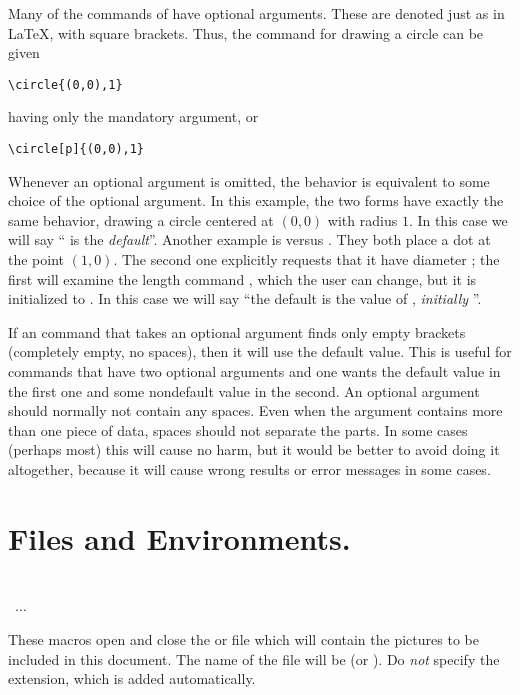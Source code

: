 \documentclass[letterpaper]{article}
\begin{document}
Many of the commands of \mfp{} have optional arguments. These are
denoted just as in \LaTeX{}, with square brackets. Thus, the command for
drawing a circle can be given
\begin{verbatim}
\circle{(0,0),1}
\end{verbatim}
having only the mandatory argument, or
\begin{verbatim}
\circle[p]{(0,0),1}
\end{verbatim}
Whenever an optional argument is omitted, the behavior is equivalent to
some choice of the optional argument. In this example, the two forms
have exactly the same behavior, drawing a circle centered at $(0,0)$
with radius $1$. In this case we will say `` is the
\emph{default}''. Another example is  versus
\oarg{3pt}. They both place a dot at the point
$(1,0)$. The second one explicitly requests that it have diameter
\dim{3pt}; the first will examine the length command ,
which the user can change, but it is initialized to \dim{2pt}. In this
case we will say ``the default is the value of ,
\emph{initially} \dim{2pt}''.

If an \mfp{} command that takes an optional argument finds only empty
brackets (completely empty, no spaces), then it will use the default
value. This is useful for commands that have two optional arguments and
one wants the default value in the first one and some nondefault value
in the second. An optional argument should normally not contain any
spaces. Even when the argument contains more than one piece of data,
spaces should not separate the parts. In some cases (perhaps most) this
will cause no harm, but it would be better to avoid doing it altogether,
because it will cause wrong results or error messages in some cases.


\section{Files and Environments.}\label{files}

\begin{cd}
\\
  \ $\ldots$\\
%
%
\end{cd}

These macros open and close the \MF{} or \MP{} file which will contain
the pictures to be included in this document.  The name of the file will
be  (or ). Do \emph{not}
specify the extension, which is added automatically.
\end{document}
